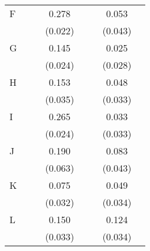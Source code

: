 \begin{longtable}{l*{3}{c}|l*{3}{c}}
	F                   &                     &                     &       0.278\sym{***}&                     &                     &       0.053         \\
	&                     &                     &     (0.022)         &                     &                     &     (0.043)         \\
	G                   &                     &                     &       0.145\sym{***}&                     &                     &       0.025         \\
	&                     &                     &     (0.024)         &                     &                     &     (0.028)         \\
	H                   &                     &                     &       0.153\sym{***}&                     &                     &       0.048         \\
	&                     &                     &     (0.035)         &                     &                     &     (0.033)         \\
	I                   &                     &                     &       0.265\sym{***}&                     &                     &       0.033         \\
	&                     &                     &     (0.024)         &                     &                     &     (0.033)         \\
	J                   &                     &                     &       0.190\sym{***}&                     &                     &       0.083\sym{*}  \\
	&                     &                     &     (0.063)         &                     &                     &     (0.043)         \\
	K                   &                     &                     &       0.075\sym{**} &                     &                     &       0.049         \\
	&                     &                     &     (0.032)         &                     &                     &     (0.034)         \\
	L                   &                     &                     &       0.150\sym{***}&                     &                     &       0.124\sym{***}\\
	&                     &                     &     (0.033)         &                     &                     &     (0.034)         \\

\end{longtable}

